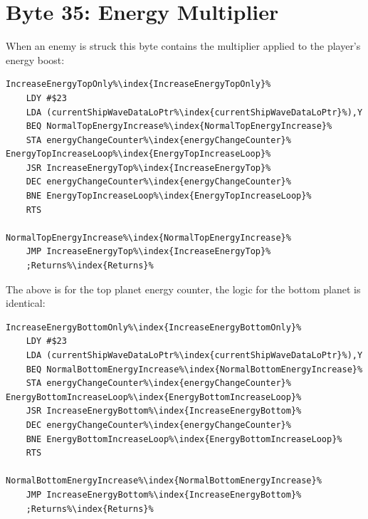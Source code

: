 \section{Byte 35: Energy Multiplier}
When an enemy is struck this byte contains the multiplier applied to the player's energy boost:

\begin{lstlisting}[escapechar=\%]
IncreaseEnergyTopOnly%\index{IncreaseEnergyTopOnly}%
    LDY #$23
    LDA (currentShipWaveDataLoPtr%\index{currentShipWaveDataLoPtr}%),Y
    BEQ NormalTopEnergyIncrease%\index{NormalTopEnergyIncrease}%
    STA energyChangeCounter%\index{energyChangeCounter}%
EnergyTopIncreaseLoop%\index{EnergyTopIncreaseLoop}%
    JSR IncreaseEnergyTop%\index{IncreaseEnergyTop}%
    DEC energyChangeCounter%\index{energyChangeCounter}%
    BNE EnergyTopIncreaseLoop%\index{EnergyTopIncreaseLoop}%
    RTS

NormalTopEnergyIncrease%\index{NormalTopEnergyIncrease}%
    JMP IncreaseEnergyTop%\index{IncreaseEnergyTop}%
    ;Returns%\index{Returns}%
\end{lstlisting}

The above is for the top planet energy counter, the logic for the bottom planet is identical:

\begin{lstlisting}[escapechar=\%]
IncreaseEnergyBottomOnly%\index{IncreaseEnergyBottomOnly}%
    LDY #$23
    LDA (currentShipWaveDataLoPtr%\index{currentShipWaveDataLoPtr}%),Y
    BEQ NormalBottomEnergyIncrease%\index{NormalBottomEnergyIncrease}%
    STA energyChangeCounter%\index{energyChangeCounter}%
EnergyBottomIncreaseLoop%\index{EnergyBottomIncreaseLoop}%
    JSR IncreaseEnergyBottom%\index{IncreaseEnergyBottom}%
    DEC energyChangeCounter%\index{energyChangeCounter}%
    BNE EnergyBottomIncreaseLoop%\index{EnergyBottomIncreaseLoop}%
    RTS

NormalBottomEnergyIncrease%\index{NormalBottomEnergyIncrease}%
    JMP IncreaseEnergyBottom%\index{IncreaseEnergyBottom}%
    ;Returns%\index{Returns}%
\end{lstlisting}



